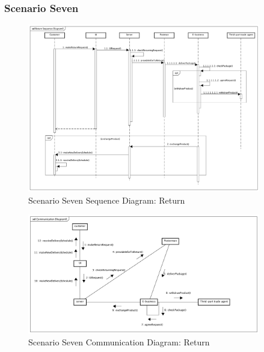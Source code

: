 \documentclass[12pt]{scrreprt}
\begin{document}
\subsubsection{Scenario Seven}
\begin{figure}[H]
  \centering\includegraphics[width=4in]{DocumentRes/7SequenceDiagram_return.png}
  \caption{Scenario Seven Sequence Diagram: Return}
\end{figure}
\begin{figure}[H]
  \centering\includegraphics[width=4in]{DocumentRes/7CommunicationDiagram_return.png}
  \caption{Scenario Seven Communication Diagram: Return}
\end{figure}
\end{document}
